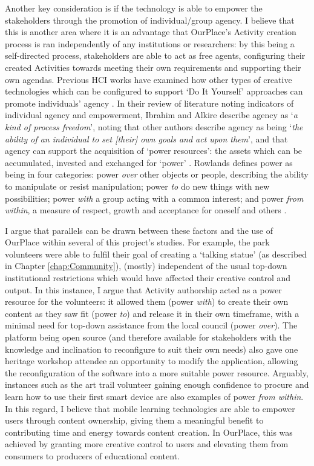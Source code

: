 Another key consideration is if the technology is able to empower the stakeholders through the promotion of individual/group agency. I believe that this is another area where it is an advantage that OurPlace's Activity creation process is ran independently of any institutions or researchers: by this being a self-directed process, stakeholders are able to act as free agents, configuring their created Activities towards meeting their own requirements and supporting their own agendas. Previous HCI works have examined how other types of creative technologies which can be configured to support `Do It Yourself' approaches can promote individuals' agency \citep{Chatting2017, Meissner2017}. In their review of literature noting indicators of individual agency and empowerment, Ibrahim and Alkire describe agency as `\textit{a kind of process freedom}', noting that other authors describe agency as being `\textit{the ability of an individual to set [their] own goals and act upon them}', and that agency can support the acquisition of `power resources': the assets which can be accumulated, invested and exchanged for `power' \citep{Ibrahim2007}. Rowlands defines power as being in four categories: power \textit{over} other objects or people, describing the ability to manipulate or resist manipulation; power \textit{to} do new things with new possibilities; power \textit{with} a group acting with a common interest; and power \textit{from within}, a measure of respect, growth and acceptance for oneself and others \citep{Rowlands1997}. 

I argue that parallels can be drawn between these factors and the use of OurPlace within several of this project's studies. For example, the park volunteers were able to fulfil their goal of creating a `talking statue' (as described in Chapter \ref{chap:Community}), (mostly) independent of the usual top-down institutional restrictions which would have affected their creative control and output. In this instance, I argue that Activity authorship acted as a power resource for the volunteers: it allowed them (power \textit{with}) to create their own content as they saw fit (power \textit{to}) and release it in their own timeframe, with a minimal need for top-down assistance from the local council (power \textit{over}). The platform being open source (and therefore available for stakeholders with the knowledge and inclination to reconfigure to suit their own needs) also gave one heritage workshop attendee an opportunity to modify the application, allowing the reconfiguration of the software into a more suitable power resource. Arguably, instances such as the art trail volunteer gaining enough confidence to procure and learn how to use their first smart device are also examples of power \textit{from within}. In this regard, I believe that mobile learning technologies are able to empower users through content ownership, giving them a meaningful benefit to contributing time and energy towards content creation. In OurPlace, this was achieved by granting more creative control to users and elevating them from consumers to producers of educational content.

